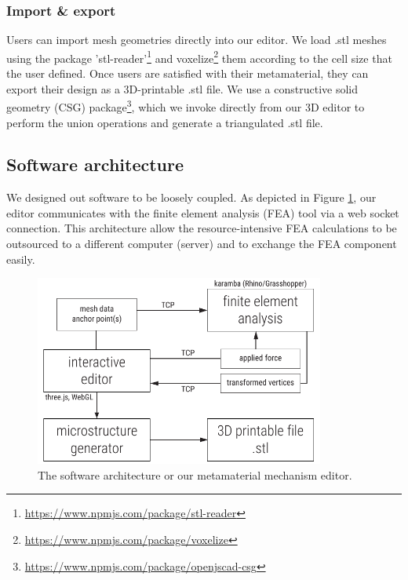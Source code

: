 \subsubsection{Import \& export}

Users can import mesh geometries directly into our editor. We load .stl meshes using the package 'stl-reader'\footnote{\url{https://www.npmjs.com/package/stl-reader}} and voxelize\footnote{\url{https://www.npmjs.com/package/voxelize}} them according to the cell size that the user defined. Once users are satisfied with their metamaterial, they can export their design as a 3D-printable .stl file. We use a constructive solid geometry (CSG) package\footnote{\url{https://www.npmjs.com/package/openjscad-csg}},
which we invoke directly from our 3D editor to perform the union operations and generate a triangulated .stl file.


\subsection{Software architecture}

We designed out software to be loosely coupled. As depicted in Figure \ref{fig:simple-software-architecture}, our editor communicates with the finite element analysis (FEA) tool via a web socket connection. This architecture allow the resource-intensive FEA calculations to be outsourced to a different computer (server) and to exchange the FEA component easily. 

\begin{figure} [h]
    \centering 
    \includegraphics[width=0.85\textwidth]{chapters/software-FIG/simple-software-architecture.pdf}
    \caption[Short figure name.]{The software architecture or our metamaterial mechanism editor.
    \label{fig:simple-software-architecture}}
\end{figure}



